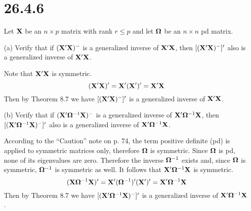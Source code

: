 \section*{26.4.6}
Let $\bf X$ be an $n\times p$ matrix with rank $r\le p$ and let
$\bf\Omega$ be an $n\times n$ pd matrix.

\bigskip
\noindent
(a) Verify that if $({\bf X}'{\bf X})^{-{}}$ is a generalized inverse
of ${\bf X}'{\bf X}$, then $[({\bf X}'{\bf X})^{-{}}]'$ also is a
generalized inverse of ${\bf X}'{\bf X}$.

\bigskip
\noindent
Note that ${\bf X}'{\bf X}$ is symmetric.
$$({\bf X}'{\bf X})'={\bf X}'({\bf X}')'={\bf X}'{\bf X}$$
Then by Theorem 8.7 we have $[({\bf X}'{\bf X})^{-{}}]'$ is a
generalized inverse of ${\bf X}'{\bf X}$.

\bigskip
\noindent
(b) Verify that if $({\bf X}'{\bf\Omega}^{-1}{\bf X})^{-{}}$
is a generalized inverse of ${\bf X}'{\bf\Omega}^{-1}{\bf X}$,
then $[({\bf X}'{\bf\Omega}^{-1}{\bf X})^{-{}}]'$ also is a
generalized inverse of ${\bf X}'{\bf\Omega}^{-1}{\bf X}$.

\bigskip
\noindent
According to the ``Caution'' note on p. 74, the term positive
definite (pd) is applied
to symmetric matrices only, therefore $\bf\Omega$ is symmetric.
Since $\bf\Omega$ is pd, none of its eigenvalues are zero.
Therefore the inverse ${\bf\Omega}^{-1}$ exists and, since
$\bf\Omega$ is symmetric, ${\bf\Omega}^{-1}$ is symmetric as well.
It follows that ${\bf X}'{\bf\Omega}^{-1}{\bf X}$ is symmetric.
$$({\bf X}{\bf\Omega}^{-1}{\bf X})'=
{\bf X}'({\bf\Omega}^{-1})'({\bf X}')'={\bf X}'{\bf\Omega}^{-1}{\bf X}$$
Then by Theorem 8.7 we have
$[({\bf X}'{\bf\Omega}^{-1}{\bf X})^{-{}}]'$ is a
generalized inverse of ${\bf X}'{\bf\Omega}^{-1}{\bf X}$.
